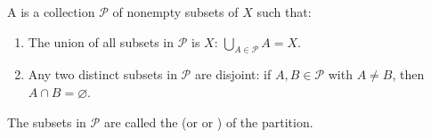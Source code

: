 \begin{definition} \label{definition:partition_of_a_set}
A  is a collection $\mathcal{P}$ of nonempty subsets of $X$ such that:
\begin{enumerate}
    \item The union of all subsets in $\mathcal{P}$ is $X$: $\bigcup_{A \in \mathcal{P}} A = X$.
    \item Any two distinct subsets in $\mathcal{P}$ are disjoint: if $A, B \in \mathcal{P}$ with $A \neq B$, then $A \cap B = \varnothing$.
\end{enumerate}
The subsets in $\mathcal{P}$ are called the  (or  or ) of the partition.

\end{definition}